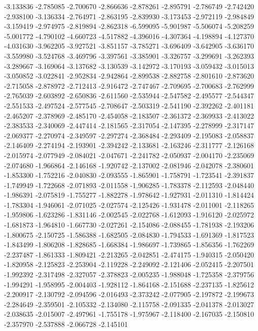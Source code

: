 -3.133836
-2.785085
-2.700670
-2.866636
-2.878261
-2.895791
-2.786749
-2.742420
-2.938100
-3.136334
-2.764971
-2.863195
-2.839930
-3.173453
-2.972119
-2.984849
-3.159419
-2.974975
-2.819894
-2.862318
-6.599095
-5.901987
-5.506074
-5.208259
-5.001772
-4.790102
-4.660723
-4.517882
-4.396016
-4.307364
-4.198894
-4.127370
-4.031630
-3.962205
-3.927521
-3.851157
-3.785271
-3.696409
-3.642905
-3.636170
-3.559980
-3.524768
-3.469796
-3.397561
-3.385901
-3.326757
-3.299691
-3.262393
-3.289667
-3.169064
-3.137682
-3.130539
-3.142972
-3.170193
-3.059432
-3.015013
-3.050852
-3.022841
-2.952834
-2.942864
-2.899538
-2.882758
-2.801610
-2.873620
-2.715058
-2.878972
-2.712413
-2.916472
-2.747467
-2.709695
-2.700683
-2.762999
-2.765039
-2.603892
-2.650836
-2.611560
-2.535944
-2.547582
-2.495577
-2.544347
-2.551533
-2.497524
-2.577545
-2.708647
-2.503319
-2.541190
-2.392262
-2.401181
-2.465207
-2.378969
-2.485170
-2.454058
-2.183507
-2.361372
-2.369933
-2.413022
-2.383533
-2.340069
-2.447414
-2.181565
-2.317054
-2.147395
-2.278999
-2.317147
-2.069377
-2.270974
-2.349597
-2.297274
-2.368484
-2.293409
-2.195083
-2.058837
-2.146409
-2.274194
-2.193901
-2.394242
-2.133681
-2.163246
-2.311777
-2.126168
-2.015974
-2.077949
-2.084021
-2.047671
-2.241782
-2.050937
-2.004170
-2.235069
-2.074680
-1.966864
-2.146168
-1.920742
-2.137002
-2.081946
-2.042078
-2.380601
-1.853300
-1.752216
-2.040830
-2.093555
-1.865901
-1.758791
-1.723541
-2.391837
-1.749949
-1.722668
-2.071893
-2.011558
-1.906285
-1.783378
-2.112593
-2.048440
-1.986391
-2.075819
-1.755277
-1.882278
-1.978642
-1.927931
-2.011310
-1.814424
-1.783304
-1.946061
-2.071025
-2.027574
-2.125426
-1.931478
-2.011001
-2.118265
-1.959806
-1.623286
-1.831146
-2.002545
-2.022768
-1.612093
-1.916120
-2.025972
-1.681873
-1.964810
-1.667730
-2.027261
-2.154086
-2.088455
-1.781938
-2.193206
-1.800675
-2.150725
-1.586388
-1.682505
-2.084830
-1.794533
-1.691369
-1.817523
-1.843499
-1.806208
-1.828685
-1.668384
-1.986697
-1.739865
-1.856356
-1.762269
-2.237487
-1.861333
-1.809421
-2.213265
-2.042851
-2.474175
-1.940315
-2.050420
-1.820958
-2.125823
-2.253904
-2.119228
-2.249092
-2.121406
-2.052415
-2.207501
-1.992392
-2.317498
-2.327057
-2.378823
-2.005235
-1.988048
-1.725358
-2.379756
-1.994291
-1.958995
-2.004403
-1.928112
-1.864168
-2.151688
-2.237135
-1.825612
-2.200917
-2.130792
-2.094596
-2.016493
-2.373242
-2.077905
-2.197872
-2.199673
-2.284649
-2.359501
-2.105332
-2.134080
-2.115758
-2.091335
-2.041378
-2.013027
-2.038635
-2.015007
-2.497961
-1.755178
-1.975967
-2.118400
-2.167035
-2.150810
-2.357970
-2.537888
-2.066728
-2.145101
